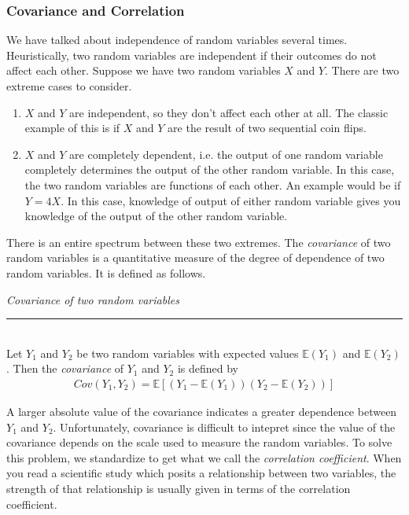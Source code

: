\documentclass[12pt]{article}
\theoremstyle{definition}
\theoremstyle{remark}
\def\E{{\mathbb E}}
\begin{document}
\subsubsection{Covariance and Correlation}
We have talked about independence of random variables several times. Heuristically, two random variables are independent if their outcomes do not affect each other. Suppose we have two random variables $X$ and $Y$. There are two extreme cases to consider.
\begin{enumerate}
\item $X$ and $Y$ are independent, so they don't affect each other at all. The classic example of this is if $X$ and $Y$ are the result of two sequential coin flips.
\item $X$ and $Y$ are completely dependent, i.e. the output of one random variable completely determines the output of the other random variable. In this case, the two random variables are functions of each other. An example would be if $Y = 4X$. In this case, knowledge of output of either random variable gives you knowledge of the output of the other random variable.
\end{enumerate}
There is an entire spectrum between these two extremes. The \emph{covariance} of two random variables is a quantitative measure of the degree of dependence of two random variables. It is defined as follows.

\begin{framed}
\emph{Covariance of two random variables}\\
  \rule{\dimexpr{}\fboxrule}{.1pt} \\
Let $Y_1$ and $Y_2$ be two random variables with expected values $\E(Y_1)$ and $\E(Y_2)$. Then the \emph{covariance} of $Y_1$ and $Y_2$ is defined by
\begin{align*}
Cov(Y_1, Y_2) = \E[ (Y_1 - \E(Y_1))(Y_2 - \E(Y_2))]
\end{align*}
\end{framed}

A larger absolute value of the covariance indicates a greater dependence between $Y_1$ and $Y_2$. Unfortunately, covariance is difficult to intepret since the value of the covariance depends on the scale used to measure the random variables. To solve this problem, we standardize to get what we call the \emph{correlation coefficient}. When you read a scientific study which posits a relationship between two variables, the strength of that relationship is usually given in terms of the correlation coefficient.
\end{document}
